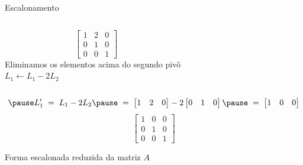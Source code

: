 \begin{resolution}{Escalonamento}
\begin{columns}
  \[\;\;\;
  \begin{bmatrix}
    1 & 2 & 0 \\
    0 & 1 & 0 \\
    0 & 0 & 1
  \end{bmatrix}
  \]
  \pause
{}
  Eliminamos os elementos acima do segundo pivô
  \\ \pause
  \(
    L_1 \leftarrow L_1 - 2 L_2
  \)
\end{columns}
\vspace{-\baselineskip}
\[
  \pause
  L'_1
  \;=\;
  L_1 - 2 L_2
  \pause
  \;=\;
  \begin{bmatrix}
    1 & 2 & 0
  \end{bmatrix}
  - 2
  \begin{bmatrix}
    0 & 1 & 0
  \end{bmatrix}
  \pause
  \;=\;
  \begin{bmatrix}
    1 & 0 & 0
  \end{bmatrix}
\]
\pause
\[
  \begin{bmatrix}
    1 & 0 & 0 \\
    0 & 1 & 0 \\
    0 & 0 & 1
  \end{bmatrix}
\]

\pause
Forma escalonada reduzida da matriz $A$
\end{resolution}

\endinput
